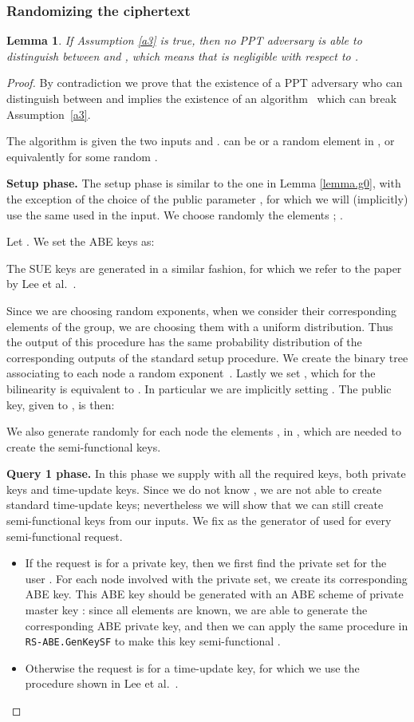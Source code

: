 \documentclass[a4paper,10pt]{article}
\newtheorem{lemma}{Lemma}
\newcommand{\algorithm}[2]{\texttt{#1.#2}}
\newcommand{\randomchoose}[1]{We choose randomly the element\ifstrequal{#1}{s}{}{s} }
\newcommand{\game}[2]{}
\newcommand{\phase}[1]{\textbf{#1 phase.} \hspace{0pt}}
\newcommand{\disclaimerSUE}{The SUE keys are generated in a similar fashion, for which we refer to the paper by Lee et al.~\cite{lee2013RSABE}.

}
\begin{document}
\subsubsection{Randomizing the ciphertext}
	\begin{lemma}
	\label{lemma.g2}
	If Assumption \ref{a3} is true, then no PPT adversary  is able to distinguish between \game{G}{2} and \game{G}{3}, which means that  is negligible with respect to .
	\end{lemma}
	\begin{proof}
		By contradiction we prove that the existence of a PPT adversary who can distinguish between \game{G}{2} and \game{G}{3} implies the existence of an algorithm~ which can break Assumption~\ref{a3}.
		
		The algorithm  is given the two inputs  and .
		 can be  or a random element  in , or equivalently  for some random .
		
	\phase{Setup}
	The setup phase is similar to the one in Lemma \ref{lemma.g0}, with the exception of the choice of the public parameter , for which we will (implicitly) use the same   used in the input.
	\randomchoose{p}{;
.
	}
	
	Let . We set the ABE keys as:
	
	\disclaimerSUE{}
	Since we are choosing random exponents, when we consider their corresponding elements of the group, we are choosing them with a uniform distribution. Thus the output of this procedure has the same probability distribution of the corresponding outputs of the standard setup procedure.
	We create the binary tree  associating to each node  a random exponent~.
	Lastly we set , which for the bilinearity is equivalent to . In particular we are implicitly setting .
	The public key, given to , is then:
	
	We also generate randomly for each node  the elements ,  in , which are needed to create the semi-functional keys.
	
	\phase{Query 1}
	In this phase we supply  with all the required keys, both private keys and time-update keys. Since we do not know , we are not able to create standard time-update keys; nevertheless we will show that we can still create semi-functional keys from our inputs. We fix  as the generator of  used for every semi-functional request.
	\begin{itemize}
		\item
		If the request is for a private key, then we first find the private set  for the user . For each node  involved with the private set, we create its corresponding ABE key. This ABE key should be generated with an ABE scheme of private master key : since all elements are known, we are able to generate the corresponding ABE private key, and then we can apply the same procedure in \algorithm{RS-ABE}{GenKeySF} to make this key semi-functional .
		\item
		Otherwise the request is for a time-update key, for which we use the procedure shown in Lee et al.~\cite{lee2013RSABE}.
		

\end{itemize}
\end{proof}
\end{document}

